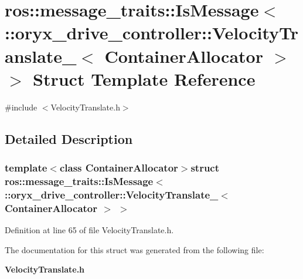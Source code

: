 \section{ros\-:\-:message\-\_\-traits\-:\-:\-Is\-Message$<$ \-:\-:oryx\-\_\-drive\-\_\-controller\-:\-:\-Velocity\-Translate\-\_\-$<$ \-Container\-Allocator $>$ $>$ \-Struct \-Template \-Reference}
\label{structros_1_1message__traits_1_1IsMessage_3_01_1_1oryx__drive__controller_1_1VelocityTranslate__49596f7073087bd373c25ac746547b88}


{\ttfamily \#include $<$\-Velocity\-Translate.\-h$>$}



\subsection{\-Detailed \-Description}
\subsubsection*{template$<$class Container\-Allocator$>$struct ros\-::message\-\_\-traits\-::\-Is\-Message$<$ \-::oryx\-\_\-drive\-\_\-controller\-::\-Velocity\-Translate\-\_\-$<$ Container\-Allocator $>$ $>$}



\-Definition at line 65 of file \-Velocity\-Translate.\-h.



\-The documentation for this struct was generated from the following file\-:\begin{DoxyCompactItemize}
\item 
{\bf \-Velocity\-Translate.\-h}\end{DoxyCompactItemize}
